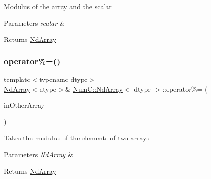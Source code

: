 Modulus of the array and the scalar


\begin{DoxyParams}{Parameters}
{\em scalar} & \\
\hline
\end{DoxyParams}
\begin{DoxyReturn}{Returns}
\mbox{\hyperlink{class_num_c_1_1_nd_array}{Nd\+Array}} 
\end{DoxyReturn}
\mbox{\label{class_num_c_1_1_nd_array_a4d0842ab19ac2b3e65b28499cccc1607}} 
\subsubsection{\texorpdfstring{operator\%=()}{operator\%=()}\hspace{0.1cm}{\footnotesize\ttfamily [1/2]}}
{\footnotesize\ttfamily template$<$typename dtype$>$ \\
\mbox{\hyperlink{class_num_c_1_1_nd_array}{Nd\+Array}}$<$dtype$>$\& \mbox{\hyperlink{class_num_c_1_1_nd_array}{Num\+C\+::\+Nd\+Array}}$<$ dtype $>$\+::operator\%= (\begin{DoxyParamCaption}\item[{const \mbox{\hyperlink{class_num_c_1_1_nd_array}{Nd\+Array}}$<$ dtype $>$ \&}]{in\+Other\+Array }\end{DoxyParamCaption})\hspace{0.3cm}{\ttfamily [inline]}}

Takes the modulus of the elements of two arrays


\begin{DoxyParams}{Parameters}
{\em \mbox{\hyperlink{class_num_c_1_1_nd_array}{Nd\+Array}}} & \\
\hline
\end{DoxyParams}
\begin{DoxyReturn}{Returns}
\mbox{\hyperlink{class_num_c_1_1_nd_array}{Nd\+Array}} 
\end{DoxyReturn}
\mbox{\label{class_num_c_1_1_nd_array_a36721fa821483a1f74598a51c7a84f60}} 
